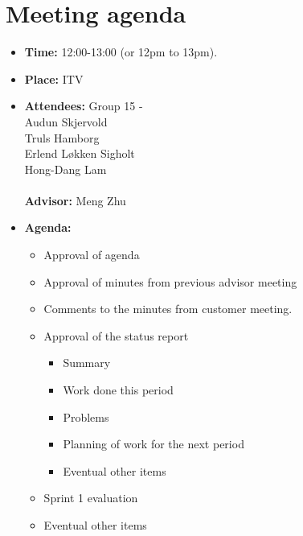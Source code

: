 \documentclass[12pt, a4paper]{article}
\begin{document}
\section{Meeting agenda }
\begin{itemize}
\item \textbf{Time:} 12:00-13:00 (or 12pm to 13pm).
\item \textbf{Place:} ITV\\
\item \textbf{Attendees:} Group 15 - \\Audun Skjervold \\ Truls Hamborg \\
     Erlend Løkken Sigholt \\ Hong-Dang Lam \\ \\ \textbf{Advisor:} Meng Zhu
\item \textbf{Agenda:} 
	\begin{itemize}
	\item Approval of agenda
	\item Approval of minutes from previous advisor meeting
	\item Comments to the minutes from customer meeting.
	\item Approval of the status report
		\begin{itemize}
		\item Summary
		\item Work done this period
		\item Problems
		\item Planning of work for the next period
		\item Eventual other items
	\end{itemize}
	\item Sprint 1 evaluation
	\item Eventual other items
	\end{itemize}
\end{itemize}
\end{document}
